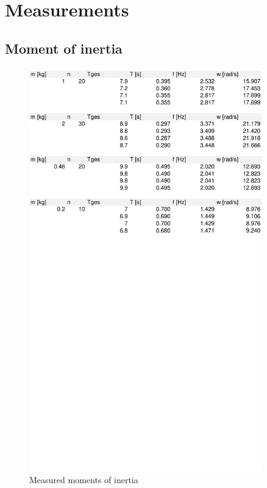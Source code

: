 \documentclass{scrreprt}
\begin{document}
\section{Measurements}
\subsection{Moment of inertia}
\begin{figure}[H]
	\centering
  \includegraphics[width=0.9\textwidth]{diag/inertia.pdf}
	\caption{Measured moments of inertia}
	\label{fig:inertia}
\end{figure}
\end{document}
